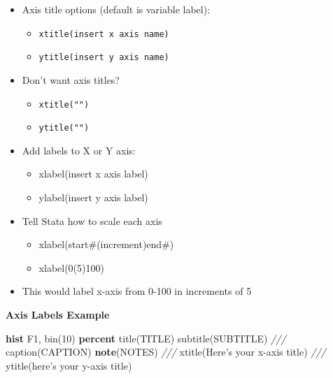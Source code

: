 \documentclass[]{book}
\newenvironment{Shaded}{\begin{snugshade}}{\end{snugshade}}
\newcommand{\BaseNTok}[1]{\textcolor[rgb]{0.00,0.00,0.81}{#1}}
\newcommand{\CommentTok}[1]{\textcolor[rgb]{0.56,0.35,0.01}{\textit{#1}}}
\newcommand{\FunctionTok}[1]{\textcolor[rgb]{0.00,0.00,0.00}{#1}}
\newcommand{\KeywordTok}[1]{\textcolor[rgb]{0.13,0.29,0.53}{\textbf{#1}}}
\newcommand{\NormalTok}[1]{#1}
\providecommand{\tightlist}{%
  \setlength{\itemsep}{0pt}\setlength{\parskip}{0pt}}
\begin{document}
\begin{itemize}
\tightlist
\item
  Axis title options (default is variable label):

  \begin{itemize}
  \tightlist
  \item
    \texttt{xtitle(insert\ x\ axis\ name)}
  \item
    \texttt{ytitle(insert\ y\ axis\ name)}
  \end{itemize}
\item
  Don't want axis titles?

  \begin{itemize}
  \tightlist
  \item
    \texttt{xtitle("")}
  \item
    \texttt{ytitle("")}
  \end{itemize}
\item
  Add labels to X or Y axis:

  \begin{itemize}
  \tightlist
  \item
    xlabel(insert x axis label)
  \item
    ylabel(insert y axis label)
  \end{itemize}
\item
  Tell Stata how to scale each axis

  \begin{itemize}
  \tightlist
  \item
    xlabel(start\#(increment)end\#)
  \item
    xlabel(0(5)100)
  \end{itemize}
\item
  This would label x-axis from 0-100 in increments of 5
\end{itemize}

\textbf{Axis Labels Example}

\begin{Shaded}
\begin{Highlighting}[]
  \KeywordTok{hist}\NormalTok{ F1, }\BaseNTok{bin}\NormalTok{(10) }\KeywordTok{percent} \BaseNTok{title}\NormalTok{(TITLE) }\BaseNTok{subtitle}\NormalTok{(SUBTITLE) }\CommentTok{///}
      \BaseNTok{caption}\NormalTok{(CAPTION) }\KeywordTok{note}\NormalTok{(NOTES) }\CommentTok{///}
      \BaseNTok{xtitle}\NormalTok{(Here's your x-axis }\BaseNTok{title}\NormalTok{) }\CommentTok{///}
  \BaseNTok{ytitle}\NormalTok{(here's your }\FunctionTok{y}\NormalTok{-axis }\BaseNTok{title}\NormalTok{)}
\end{Highlighting}
\end{Shaded}
\end{document}
